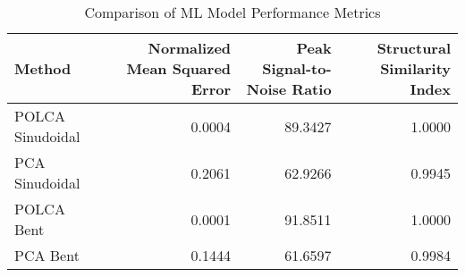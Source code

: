 \begin{table}[htbp]
\caption{Comparison of ML Model Performance Metrics}
\label{tab:model_comparison}
\begin{tabular}{lrrr}
\toprule
Method & Normalized Mean Squared Error & Peak Signal-to-Noise Ratio & Structural Similarity Index \\
\midrule
POLCA Sinudoidal & 0.0004 & 89.3427 & 1.0000 \\
PCA Sinudoidal & 0.2061 & 62.9266 & 0.9945 \\
POLCA Bent & 0.0001 & 91.8511 & 1.0000 \\
PCA Bent & 0.1444 & 61.6597 & 0.9984 \\
\bottomrule
\end{tabular}
\end{table}

